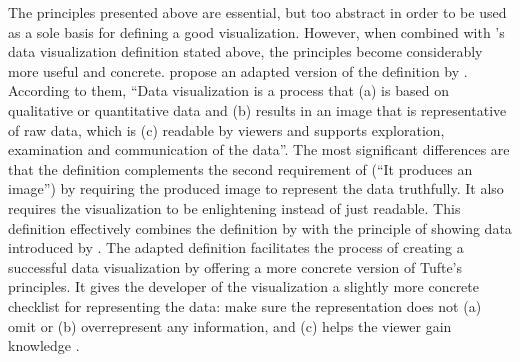 The principles presented above are essential, but too abstract in order to be used as a sole basis for defining a good visualization. However, when combined with \citeauthor{kosara_visualization_2007}'s data visualization definition stated above, the principles become considerably more useful and concrete. \citet{azzam_j-b_2013} propose an adapted version of the definition by \citet{kosara_visualization_2007}. According to them, ``Data visualization is a process that (a) is based on qualitative or quantitative data and (b) results in an image that is representative of raw data, which is (c) readable by viewers and supports exploration, examination and communication of the data''. The most significant differences are that the definition complements the second requirement of \citeauthor{kosara_visualization_2007} (``It produces an image'') by requiring the produced image to represent the data truthfully. It also requires the visualization to be enlightening instead of just readable. This definition effectively combines the definition by \citet{kosara_visualization_2007} with the principle of showing data introduced by \citet{tufte_visual_1986}. The adapted definition facilitates the process of creating a successful data visualization by offering a more concrete version of Tufte's principles. It gives the developer of the visualization a slightly more concrete checklist for representing the data: make sure the representation does not (a) omit or (b) overrepresent any information, and (c) helps the viewer gain knowledge \citep{azzam_j-b_2013}. 


